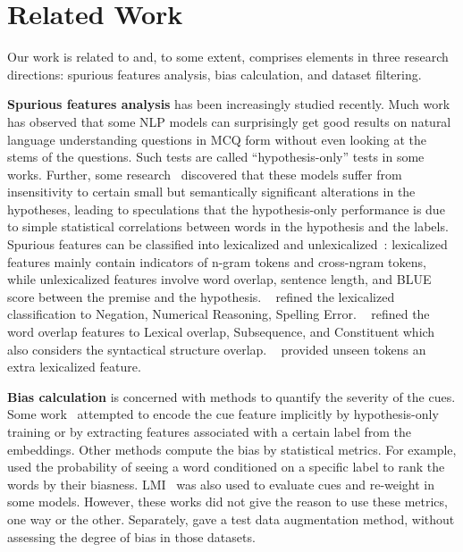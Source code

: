 \section{Related Work}
\label{sec:related}

Our work is related to and, to some extent, comprises 
elements in three research directions: spurious features analysis, 
bias calculation, and dataset filtering. 
 
\textbf{Spurious features analysis} has been increasingly studied recently. 
Much work~\cite{sharma2018tackling,srinivasan2018simple,zellers2018swag} 
has observed that some NLP models can surprisingly 
get good results on natural language understanding questions in MCQ form without 
even looking at the stems of the questions. Such tests are called
``hypothesis-only'' tests in some works.
Further, some research~\cite{sanchez2018behavior} discovered that these models 
suffer from insensitivity to certain small but semantically significant alterations
in the hypotheses, leading to speculations that the hypothesis-only performance
is due to simple statistical correlations between words in the hypothesis 
and the labels. 
Spurious features can be classified into
lexicalized and unlexicalized~\cite{bowman2015large}:
lexicalized features mainly contain indicators of n-gram tokens and cross-ngram tokens, 
while unlexicalized features involve word overlap, sentence length, and BLUE score between 
the premise and the hypothesis. ~\cite{naik2018stress} refined the 
lexicalized classification to Negation, Numerical Reasoning, 
Spelling Error. ~\cite{mccoy2019right} refined the word overlap 
features to Lexical overlap, Subsequence, and Constituent 
which also considers the syntactical structure overlap. ~\cite{sanchez2018behavior} 
provided unseen tokens an extra lexicalized feature. 

\textbf{Bias calculation} is concerned with methods to quantify the severity of the cues. 
Some work~\cite{clark2019don,he2019unlearn,yaghoobzadeh2019robust} 
attempted to encode the cue feature implicitly by 
hypothesis-only training or by extracting features associated with a certain label 
from the embeddings. 
Other methods compute the bias by statistical metrics. 
For example, \cite{yu2020reclor} used the probability of seeing a word 
conditioned on a specific label to rank the words by their biasness. 
LMI~\cite{schuster2019towards} was also used to evaluate cues and 
re-weight in some models. 
However, these works did not give the reason to use these metrics, one way or 
the other.
Separately, \cite{Marco2020acl} gave a test data augmentation method, 
without assessing the degree of bias in those datasets.

